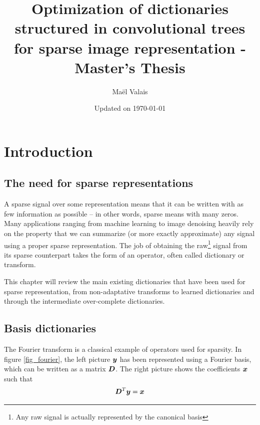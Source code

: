 


\author{Maël Valais}
\date{Updated on \today}
\title{Optimization of dictionaries structured in convolutional trees for sparse image representation - Master's Thesis}


\chapter{Introduction}

\section{The need for sparse representations}

A sparse signal over some representation means that it can be written with as few information as possible – in other words, sparse means with many zeros. Many applications ranging from machine learning to image denoising heavily rely on the property that we can summarize (or more exactly approximate) any signal using a proper sparse representation. The job of obtaining the raw\footnote{Any raw signal is actually represented by the canonical basis} signal from its sparse counterpart takes the form of an operator, often called dictionary or transform.

This chapter will review the main existing dictionaries that have been used for sparse representation, from non-adaptative transforms to learned dictionaries and through the intermediate over-complete dictionaries.

\section{Basis dictionaries}

The Fourier transform is a classical example of operators used for sparsity. In figure \ref{fig_fourier}, the left picture $\bm y$ has been represented using a Fourier basis, which can be written as a matrix $\bm D$. The right picture shows the coefficients $\bm x$ such that
$$\bm D^T\bm y = \bm x$$

